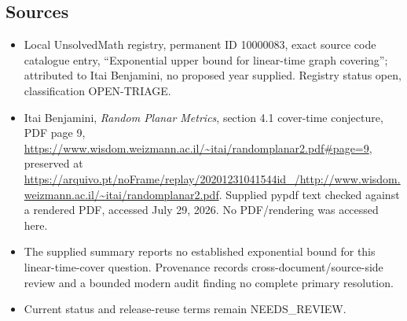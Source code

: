 \documentclass[11pt]{article}
\begin{document}
\subsection{Sources}
\begin{itemize}
\item Local UnsolvedMath registry, permanent ID 10000083, exact source code catalogue entry, ``Exponential upper bound for linear-time graph covering''; attributed to Itai Benjamini, no proposed year supplied. Registry status open, classification OPEN-TRIAGE.
\item Itai Benjamini, \emph{Random Planar Metrics}, section 4.1 cover-time conjecture, PDF page 9, \url{https://www.wisdom.weizmann.ac.il/~itai/randomplanar2.pdf#page=9}, preserved at \url{https://arquivo.pt/noFrame/replay/20201231041544id_/http://www.wisdom.weizmann.ac.il/~itai/randomplanar2.pdf}. Supplied pypdf text checked against a rendered PDF, accessed July 29, 2026. No PDF/rendering was accessed here.
\item The supplied summary reports no established exponential bound for this linear-time-cover question. Provenance records cross-document/source-side review and a bounded modern audit finding no complete primary resolution.
\item Current status and release-reuse terms remain NEEDS\_REVIEW.
\end{itemize}
\end{document}
